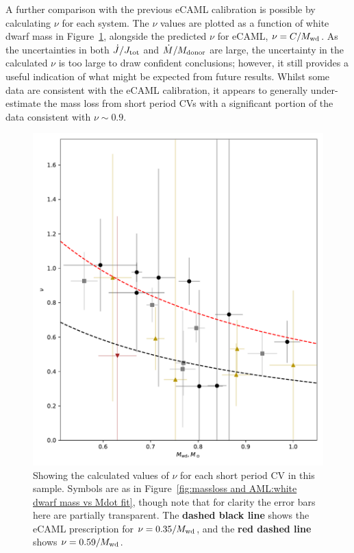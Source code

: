 A further comparison with the previous eCAML calibration is possible by calculating $\nu$ for each system.
The $\nu$ values are plotted as a function of white dwarf mass in Figure~\ref{fig:massloss and AML:calculated nu for all short period CVs}, alongside the predicted $\nu$ for eCAML, $\nu = C / M_{\rm wd}$.
As the uncertainties in both $\dot J/J_{\rm tot}$ and $\dot M / M_{\rm donor}$ are large, the uncertainty in the calculated $\nu$ is too large to draw confident conclusions; however, it still provides a useful indication of what might be expected from future results.
Whilst some data are consistent with the \citet{Schreiber2016} eCAML calibration, it appears to generally under-estimate the mass loss from short period CVs with a significant portion of the data consistent with $\nu \sim 0.9$.
\begin{figure}
    \centering
    \includegraphics[width=\textwidth]{figures/results/Mdot/nu_for_each_system.pdf}
    \caption{Showing the calculated values of $\nu$ for each short period CV in this sample. Symbols are as in Figure~\ref{fig:massloss and AML:white dwarf mass vs Mdot fit}, though note that for clarity the error bars here are partially transparent. The {\bf dashed black line} shows the eCAML prescription for $\nu = 0.35 / M_{\rm wd}$, and the {\bf red dashed line} shows $\nu = 0.59 / M_{\rm wd}$.}
    \label{fig:massloss and AML:calculated nu for all short period CVs}
\end{figure}


